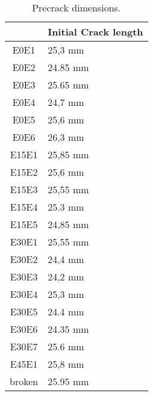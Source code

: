 \begin{table}[h]
	\centering
	\begin{tabular}{m{} m{}}\toprule
		\multicolumn{1}{l}{} & \multicolumn{1}{l}{Initial Crack length} \\\midrule
		\multicolumn{1}{c}{\cellcolor[HTML]{F8CBAD}E0E1} & 25,3   mm \\
		\multicolumn{1}{c}{\cellcolor[HTML]{F8CBAD}E0E2} & 24.85 mm \\
		\multicolumn{1}{c}{\cellcolor[HTML]{F8CBAD}E0E3} & 25.65 mm \\
		\multicolumn{1}{c}{\cellcolor[HTML]{F8CBAD}E0E4} & 24,7 mm \\
		\multicolumn{1}{c}{\cellcolor[HTML]{F8CBAD}E0E5} & 25,6 mm \\
		\multicolumn{1}{c}{\cellcolor[HTML]{F8CBAD}E0E6} & 26,3 mm \\
		\multicolumn{1}{c}{\cellcolor[HTML]{C65911}E15E1} & 25,85 mm \\ 
		\multicolumn{1}{c}{\cellcolor[HTML]{C65911}E15E2} & 25,6 mm \\ 
		\multicolumn{1}{c}{\cellcolor[HTML]{C65911}E15E3} & 25,55 mm \\ 
		\multicolumn{1}{c}{\cellcolor[HTML]{C65911}E15E4} & 25.3 mm \\
		\multicolumn{1}{c}{\cellcolor[HTML]{C65911}E15E5} & 24,85 mm \\ 
		\multicolumn{1}{c}{\cellcolor[HTML]{BF8F00}E30E1} & 25,55 mm \\ 
		\multicolumn{1}{c}{\cellcolor[HTML]{BF8F00}E30E2} & 24,4 mm \\ 
		\multicolumn{1}{c}{\cellcolor[HTML]{BF8F00}E30E3} & 24,2 mm \\ 
		\multicolumn{1}{c}{\cellcolor[HTML]{BF8F00}E30E4} & 25,3 mm \\ 
		\multicolumn{1}{c}{\cellcolor[HTML]{BF8F00}E30E5} & 24.4 mm \\ 
		\multicolumn{1}{c}{\cellcolor[HTML]{BF8F00}E30E6} & 24.35 mm \\ 
		\multicolumn{1}{c}{\cellcolor[HTML]{BF8F00}E30E7} & 25.6 mm \\
		\multicolumn{1}{c}{\cellcolor[HTML]{FFA500}E45E1} & 25,8 mm \\ 
		\multicolumn{1}{c}{\cellcolor[HTML]{00FF00}broken} & 25.95 mm \\\bottomrule
	\end{tabular}
	\caption{Precrack dimensions.}
	\label{tab:Tab11}
\end{table}

